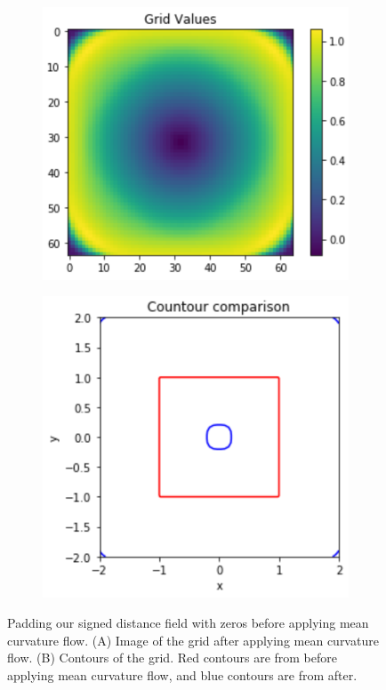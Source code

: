 \begin{figure}[H]
	\centering
	\begin{subfigure}[b]{0.45\linewidth}
		\centering
		\includegraphics[width=\linewidth]{Materials/MeanFlow/d1}
		\caption{}
		\label{d1}
	\end{subfigure}
	\hfill
	\begin{subfigure}[b]{0.45\linewidth}
		\centering
		\includegraphics[width=\linewidth]{Materials/MeanFlow/d2}
		\caption{}
		\label{d2}
	\end{subfigure}
	\caption{Padding our signed distance field with zeros before applying mean curvature flow. (A) Image of the grid after applying mean curvature flow. (B) Contours of the grid. Red contours are from before applying mean curvature flow, and blue contours are from after.}
	\label{dirichlet}
\end{figure}
